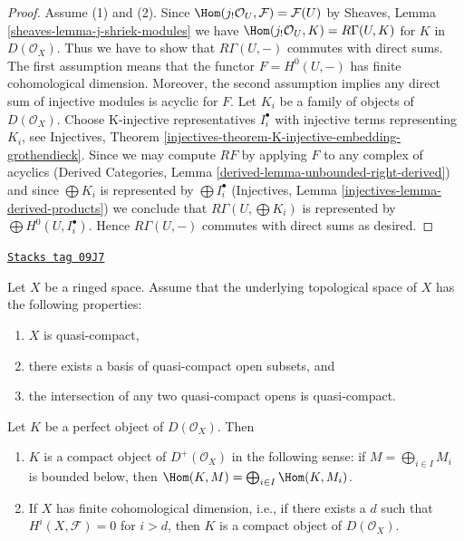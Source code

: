 \begin{proof}
Assume (1) and (2). Since
$\Hom(j_!\mathcal{O}_U, \mathcal{F}) = \mathcal{F}(U)$
by Sheaves, Lemma \ref{sheaves-lemma-j-shriek-modules}
we have $\Hom(j_!\mathcal{O}_U, K) = R\Gamma(U, K)$ for
$K$ in $D(\mathcal{O}_X)$. Thus we have to show that $R\Gamma(U, -)$
commutes with direct sums. The first assumption means that the functor
$F = H^0(U, -)$ has finite cohomological dimension. Moreover, the second
assumption implies any direct sum of injective modules is acyclic for $F$.
Let $K_i$ be a family of objects of $D(\mathcal{O}_X)$.
Choose K-injective representatives $I_i^\bullet$ with injective terms
representing $K_i$, see Injectives, Theorem
\ref{injectives-theorem-K-injective-embedding-grothendieck}.
Since we may compute $RF$ by applying $F$ to any complex of acyclics
(Derived Categories, Lemma \ref{derived-lemma-unbounded-right-derived})
and since $\bigoplus K_i$ is represented by $\bigoplus I_i^\bullet$
(Injectives, Lemma \ref{injectives-lemma-derived-products})
we conclude that $R\Gamma(U, \bigoplus K_i)$ is represented by
$\bigoplus H^0(U, I_i^\bullet)$. Hence $R\Gamma(U, -)$ commutes
with direct sums as desired.
\end{proof}

\begin{lemma}
\label{cohomology-lemma-perfect-is-compact}
\href{https://stacks.math.columbia.edu/tag/09J7}{\texttt{Stacks tag 09J7}}

Let $X$ be a ringed space. Assume that the underlying topological space
of $X$ has the following properties:
\begin{enumerate}
\item $X$ is quasi-compact,
\item there exists a basis of quasi-compact open subsets, and
\item the intersection of any two quasi-compact opens is quasi-compact.
\end{enumerate}
Let $K$ be a perfect object of $D(\mathcal{O}_X)$. Then
\begin{enumerate}
\item[(a)] $K$ is a compact object of $D^+(\mathcal{O}_X)$
in the following sense: if $M = \bigoplus_{i \in I} M_i$ is
bounded below, then $\Hom(K, M) = \bigoplus_{i \in I} \Hom(K, M_i)$.
\item[(b)] If $X$ has finite cohomological dimension, i.e., if there exists
a $d$ such that $H^i(X, \mathcal{F}) = 0$ for $i > d$, then
$K$ is a compact object of $D(\mathcal{O}_X)$.
\end{enumerate}
\end{lemma}

